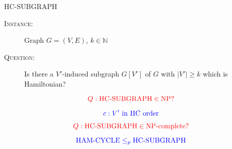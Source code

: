 \begin{frame}
  \begin{exampleblock}{HC-SUBGRAPH}
	\begin{description}
	  \item[\textsc{Instance}:] Graph $G = (V, E)$, $k \in \mathbb{N}$
	  \item[\textsc{Question}:] Is there a $V'$-induced subgraph $G[V']$ of $G$ with $|V'| \ge k$ which is Hamiltonian?
	\end{description}
  \end{exampleblock}

  \pause
  \[
	\textcolor{red}{Q: \text{HC-SUBGRAPH} \in \text{NP}?}
  \]

  \pause
  \[
	\textcolor{blue}{c: V' \text{ in HC order}}
  \]

  \pause
  \[
	\textcolor{red}{Q: \text{HC-SUBGRAPH} \in \text{NP-complete}?}
  \]

  \pause
  \[
	\textcolor{blue}{\text{HAM-CYCLE}{} \le_{p}{} \text{HC-SUBGRAPH}}
  \]
\end{frame}
